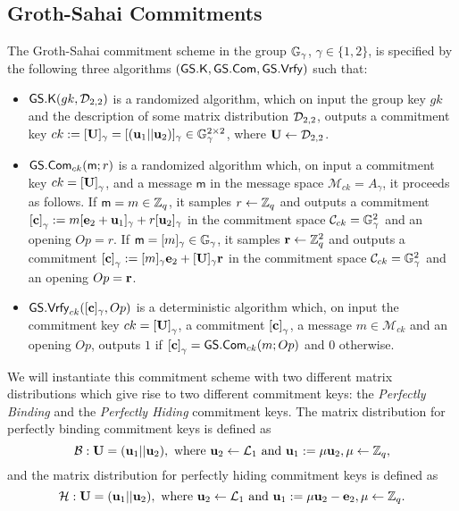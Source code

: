 \subsection{Groth-Sahai Commitments} \label{sec:gs-comms}
 
\begin{definition} The Groth-Sahai commitment scheme in the group $\mathbb{G}_\gamma$, $\gamma\in\{1,2\}$, is  specified by the following three algorithms 
	$(\mathsf{GS}.\mathsf{K},\mathsf{GS}.\mathsf{Com},\mathsf{GS}.\mathsf{Vrfy})$ such that:
	\begin{itemize} 
		\item  $\mathsf{GS}.\mathsf{K}(gk,\mathcal{D}_{2,2})$ is a randomized algorithm, which on input the group key $gk$ and the description of some matrix distribution $\mathcal{D}_{2,2}$, outputs a commitment key $ck:=[\mathbf{{U}}]_\gamma=[(\mathbf{u}_1||\mathbf{u}_2)]_\gamma \in\mathbb{G}_\gamma^{2\times 2}$, where $\mathbf{{U}}\gets\mathcal{D}_{2,2}$.
		\item $\mathsf{GS}.\mathsf{Com}_{ck}(\mathsf{m};r)$ is a randomized algorithm which, on input a commitment key $ck=\left[\mathbf{{U}}\right]_\gamma$, and a message 
		$\mathsf{m}$ in the message space $\mathcal{M}_{ck}=A_\gamma$, it proceeds as follows. If $\mathsf{m}=m\in\mathbb{Z}_q$, it samples $r \gets \mathbb{Z}_q$ and outputs a commitment $\left[\mathbf{c}\right]_\gamma := m[\mathbf{e}_2+\mathbf{u}_1]_\gamma+r[\mathbf{u}_2]_\gamma$ in the commitment space $\mathcal{C}_{ck}=\mathbb{G}_\gamma^2$ and an opening $Op=r$. If $\mathsf{m}=[m]_\gamma\in\mathbb{G}_\gamma$, it samples $\mathbf{r} \gets \mathbb{Z}_q^2$ and outputs a commitment $\left[\mathbf{c}\right]_\gamma := [m]_\gamma\mathbf{e}_2+[\mathbf{{U}}]_\gamma\mathbf{r}$ in the commitment space $\mathcal{C}_{ck}=\mathbb{G}_\gamma^2$ and an opening $Op=\mathbf{r}$.
		\item $\mathsf{GS}.\mathsf{Vrfy}_{ck}([\mathbf{c}]_\gamma,Op)$ is a deterministic algorithm which, on input the commitment key $ck=\left[\mathbf{{U}}\right]_\gamma$, a commitment $\left[\mathbf{c}\right]_\gamma$,  a message 
		$m \in \mathcal{M}_{ck}$ and an opening $Op$, outputs $1$ if $\left[\mathbf{c}\right]_\gamma={\mathsf{GS}}.\mathsf{Com}_{ck}(m;Op)$
		and $0$ otherwise.
	\end{itemize}
\end{definition}

We will instantiate this commitment scheme with two different matrix distributions which give rise to two different commitment keys: the \emph{Perfectly Binding} and the \emph{Perfectly Hiding} commitment keys. The matrix distribution for perfectly binding commitment keys is defined as
$$
\mathcal{B}:\mathbf{{U}}=(\mathbf{u}_1||\mathbf{u}_2),\text{ where }\mathbf{u}_2\gets\mathcal{L}_1\text{ and } \mathbf{u}_1 :=\mu\mathbf{u}_2, \mu\gets\mathbb{Z}_q,
$$
and the matrix distribution for perfectly hiding commitment keys is defined as
$$
\mathcal{H}:\mathbf{{U}}=(\mathbf{u}_1||\mathbf{u}_2),\text{ where } \mathbf{u}_2\gets\mathcal{L}_1\text{ and } \mathbf{u}_1 :=\mu\mathbf{u}_2-\mathbf{e}_2, \mu\gets\mathbb{Z}_q.
$$

